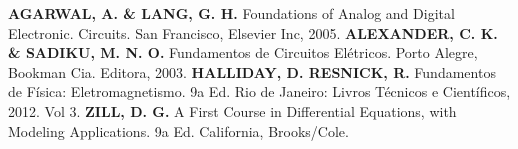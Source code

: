 \documentclass[12pt,a4paper]{article}
\begin{document}
\begin{multicols*}{2}
    
    
\begin{thebibliography}{99}
                \textbf{AGARWAL, A. \& LANG, G. H.}
                Foundations of Analog and Digital Electronic. Circuits. San Francisco, Elsevier Inc, 2005.
                \textbf{ALEXANDER, C. K. \& SADIKU, M. N. O.}
                Fundamentos de Circuitos Elétricos. Porto Alegre, Bookman Cia. Editora, 2003.
                \textbf{HALLIDAY, D. RESNICK, R.}
                Fundamentos de Física: Eletromagnetismo. 9a Ed. Rio de Janeiro: Livros Técnicos e Científicos, 2012. Vol 3.
                \textbf{ZILL, D. G.}
                A First Course in Differential Equations, with Modeling Applications. 9a Ed. California, Brooks/Cole.


\end{thebibliography}
\end{multicols*}
\end{document}
